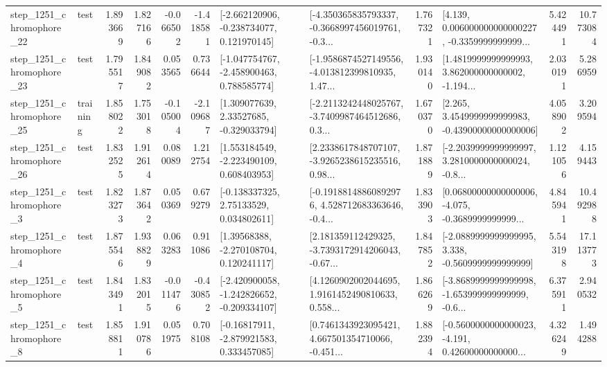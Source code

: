 \begin{tabular}{llrrrrllrlrr}
 step\_1251\_chromophore\_22 &      test &      1.893669 &    1.827166 &     -0.066502 & -1.418581 &   [-2.662120906, -0.238734077, 0.121970145] &  [-4.350365835793337, -0.3668997456019761, -0.3... &       1.767321 &  [4.139, 0.006000000000000227, -0.3359999999999... &            5.424491 &         10.773084 \\
 step\_1251\_chromophore\_23 &      test &      1.795517 &    1.849082 &      0.053565 &  0.736644 &   [-1.047754767, -2.458900463, 0.788585774] &  [-1.9586874527149556, -4.013812399810935, 1.47... &       1.930140 &  [1.4819999999999993, 3.862000000000002, -1.194... &            2.030191 &          5.286959 \\
 step\_1251\_chromophore\_25 &  training &      1.858022 &    1.753018 &     -0.105004 & -2.109687 &     [1.309077639, 2.33527685, -0.329033794] &  [-2.2113242448025767, -3.7409987464512686, 0.3... &       1.670370 &  [2.265, 3.4549999999999983, -0.43900000000000006] &            4.058902 &          3.209594 \\
 step\_1251\_chromophore\_26 &      test &      1.832525 &    1.912614 &      0.080089 &  1.212754 &    [1.553184549, -2.223490109, 0.608403953] &  [2.2338617848707107, -3.9265238615235516, 0.98... &       1.871889 &  [-2.2039999999999997, 3.2810000000000024, -0.8... &            1.121056 &          4.159443 \\
  step\_1251\_chromophore\_3 &      test &      1.823273 &    1.873642 &      0.050369 &  0.679279 &     [-0.138337325, 2.75133529, 0.034802611] &  [-0.19188148860892976, 4.528712683363646, -0.4... &       1.833903 &  [0.06800000000000006, -4.075, -0.3689999999999... &            4.845941 &         10.492988 \\
  step\_1251\_chromophore\_4 &      test &      1.875546 &    1.938829 &      0.063283 &  0.911086 &     [1.39568388, -2.270108704, 0.120241117] &  [2.181359112429325, -3.7393172914206043, -0.67... &       1.847852 &  [-2.0889999999999995, 3.338, -0.5609999999999999] &            5.543198 &         17.113773 \\
  step\_1251\_chromophore\_5 &      test &      1.843491 &    1.832015 &     -0.011476 & -0.430852 &  [-2.420900058, -1.242826652, -0.209334107] &  [4.1260902002044695, 1.9161452490810633, 0.558... &       1.866269 &  [-3.8689999999999998, -1.653999999999999, -0.6... &            6.375911 &          2.940532 \\
  step\_1251\_chromophore\_8 &      test &      1.858811 &    1.910786 &      0.051975 &  0.708108 &    [-0.16817911, -2.879921583, 0.333457085] &  [0.7461343923095421, 4.667501354710066, -0.451... &       1.882394 &  [-0.5600000000000023, -4.191, 0.42600000000000... &            4.326249 &          1.494288 \\

\end{tabular}
